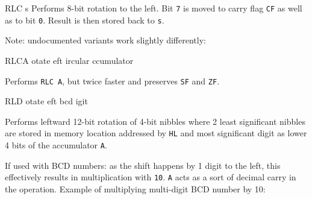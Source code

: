 \begin{basedescript}{
	\desclabelstyle{\multilinelabel}
	\desclabelwidth{3cm}}
\begin{DetailItem}{RLC s}
		Performs 8-bit rotation to the left. Bit {\tt 7} is moved to carry flag {\tt CF} as well as to bit {\tt 0}. Result is then stored back to {\tt s}.

		Note: undocumented variants work slightly differently:

		\begin{multicols}{2}

		\end{multicols}

		\begin{DetailEffects}[p]
			\FlagsRLCr
		\end{DetailEffects}
						
		\begin{DetailTiming}
		\end{DetailTiming}

	\end{DetailItem}

	\pagebreak
	\begin{DetailItem}{RLCA}
		{otate eft ircular ccumulator}
		{\SymRLC{A}}
		
		Performs {\tt RLC A}, but twice faster and preserves {\tt SF} and {\tt ZF}.

		\begin{DetailEffects}
			\FlagsRLCA
		\end{DetailEffects}
						
		\begin{DetailTiming}
			\DetailTime{1}{4}
		\end{DetailTiming}

	\end{DetailItem}

	\label{DetailRefRLD}
	\begin{DetailItem}{RLD}
		{otate eft bcd igit}
		{\SymRLD}

		Performs leftward 12-bit rotation of 4-bit nibbles where 2 least significant nibbles are stored in memory location addressed by {\tt HL} and most significant digit as lower 4 bits of the accumulator {\tt A}.
        
		If used with BCD numbers: as the shift happens by 1 digit to the left, this effectively results in multiplication with {\tt 10}. {\tt A} acts as a sort of decimal carry in the operation. Example of multiplying multi-digit BCD number by 10:


\end{DetailItem}
\end{basedescript}

